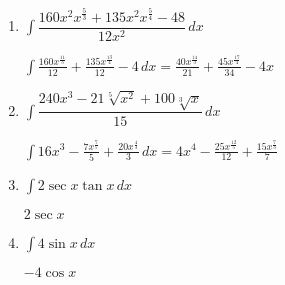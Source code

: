 \documentclass[answers]{exam}
\begin{document}
\begin{questions}
\begin{enumerate}
        \item $\displaystyle \int \dfrac{160x^2x^{\frac{5}{3}}+135x^2x^{\frac{5}{4}}-48}{12x^2}\, dx$
        \begin{solution}
        $\displaystyle \int \frac{160x^{\frac{11}{3}}}{12} + \frac{135x^{\frac{13}{4}}}{12} - 4 \, dx = \frac{40x^{\frac{14}{3}}}{21} + \frac{45x^{\frac{17}{4}}}{34} - 4x $
        \end{solution}

        \item $\displaystyle \int \dfrac{240x^3-21\sqrt[5]{x^2}+100\sqrt[3]{x}}{15}\, dx$
        \begin{solution}
        $\displaystyle \int 16x^3 - \frac{7x^{\frac{7}{5}}}{5} + \frac{20x^{\frac{4}{3}}}{3} \, dx = 4x^4 - \frac{25x^{\frac{12}{5}}}{12} + \frac{15x^{\frac{7}{3}}}{7} $
        \end{solution}

        \item $\displaystyle \int 2\sec x \tan x\, dx$
        \begin{solution}
        $\displaystyle 2\sec x $
        \end{solution}

        \item $\displaystyle \int 4\sin x \, dx$
        \begin{solution}
        $\displaystyle -4\cos x $
        \end{solution}
        
    \end{enumerate}

\end{questions}
\end{document}
